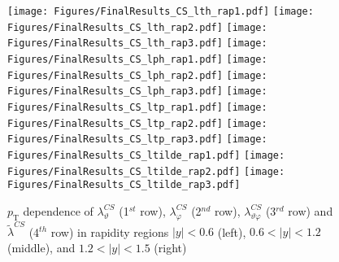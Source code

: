 \documentclass[12pt]{article}
\newcommand{\pT}{p_\mathrm{T}}
\newcommand{\absy}{\left |  y \right |}
\newcommand{\lamthCS}{\lambda^{\scriptscriptstyle CS}_\vartheta}
\newcommand{\lamphCS}{\lambda^{\scriptscriptstyle CS}_\varphi}
\newcommand{\lamthphCS}{\lambda^{\scriptscriptstyle CS}_{\vartheta \varphi}}
\newcommand{\lamtildeCS}{\tilde{\lambda}^{\scriptscriptstyle CS}}
\begin{document}



\begin{figure}[htbp]
\centering
\texttt{[image: Figures/FinalResults\_CS\_lth\_rap1.pdf]}
\texttt{[image: Figures/FinalResults\_CS\_lth\_rap2.pdf]}
\texttt{[image: Figures/FinalResults\_CS\_lth\_rap3.pdf]}
\texttt{[image: Figures/FinalResults\_CS\_lph\_rap1.pdf]}
\texttt{[image: Figures/FinalResults\_CS\_lph\_rap2.pdf]}
\texttt{[image: Figures/FinalResults\_CS\_lph\_rap3.pdf]}
\texttt{[image: Figures/FinalResults\_CS\_ltp\_rap1.pdf]}
\texttt{[image: Figures/FinalResults\_CS\_ltp\_rap2.pdf]}
\texttt{[image: Figures/FinalResults\_CS\_ltp\_rap3.pdf]}
\texttt{[image: Figures/FinalResults\_CS\_ltilde\_rap1.pdf]}
\texttt{[image: Figures/FinalResults\_CS\_ltilde\_rap2.pdf]}
\texttt{[image: Figures/FinalResults\_CS\_ltilde\_rap3.pdf]}
\caption{$\pT$ dependence of $\lamthCS$
(1$^{st}$ row), $\lamphCS$ (2$^{nd}$ row), $\lamthphCS$ (3$^{rd}$ row) and 
$\lamtildeCS$ (4$^{th}$ row) in rapidity regions $\absy<0.6$ (left), 
$0.6<\absy<1.2$ (middle), and $1.2<\absy<1.5$ (right)}
\end{figure}
\clearpage
\end{document}

